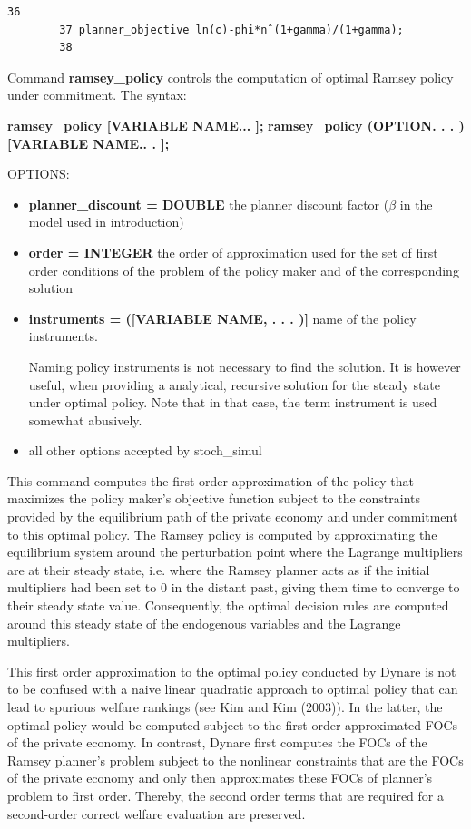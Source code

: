 \documentclass[10pt,math=newtx,citestyle=gb7714-2015,bibstyle=gb7714-2015]{elegantbook}
\begin{document}
{	\begin{lstlisting}[frame=shadowbox]
		36
		37 planner_objective ln(c)-phi*nˆ(1+gamma)/(1+gamma);
		38
	\end{lstlisting}
	
	Command \textbf{ramsey\_policy} controls the computation of optimal Ramsey policy under commitment. The syntax:
	
	\textbf{ramsey\_policy [VARIABLE NAME... ];}
	\textbf{ramsey\_policy (OPTION. . . ) [VARIABLE NAME.. . ];}
	
	OPTIONS:
	\begin{itemize}
		\item \textbf{planner\_discount = DOUBLE} the planner discount factor ($\beta$ in the model used in introduction)
		\item \textbf{order = INTEGER} the order of approximation used for the set of first order conditions of the problem of the policy maker and of the corresponding solution
		\item \textbf{instruments = ([VARIABLE NAME, . . . )]} name of the policy instruments.
		
		Naming policy instruments is not necessary to find the solution. It is however useful, when providing a analytical, recursive solution for the steady state under optimal policy. Note that in that case, the term instrument is used somewhat abusively.
		\item all other options accepted by stoch\_simul
	\end{itemize}
	
	This command computes the first order approximation of the policy that maximizes the policy maker’s objective function subject to the constraints provided by the equilibrium path of the private economy and under commitment to this optimal policy. The Ramsey policy is computed by approximating the equilibrium system around the perturbation point where the Lagrange multipliers are at their steady state, i.e. where the Ramsey planner acts as if the initial multipliers had been set to 0 in the distant past, giving them time to converge to their steady state value. Consequently, the optimal decision rules are computed around this steady state of the endogenous variables and the Lagrange multipliers.
	
	This first order approximation to the optimal policy conducted by Dynare is not to be confused with a naive linear quadratic approach to optimal policy that can lead to spurious welfare rankings (see Kim and Kim (2003)). In the latter, the optimal policy would be computed subject to the first order approximated FOCs of the private economy. In contrast, Dynare first computes the FOCs of the Ramsey planner’s problem subject to the nonlinear constraints that are the FOCs of the private economy and only then approximates these FOCs of planner’s problem to first order. Thereby, the second order terms that are required for a second-order correct welfare evaluation are preserved.
	
}
\end{document}
